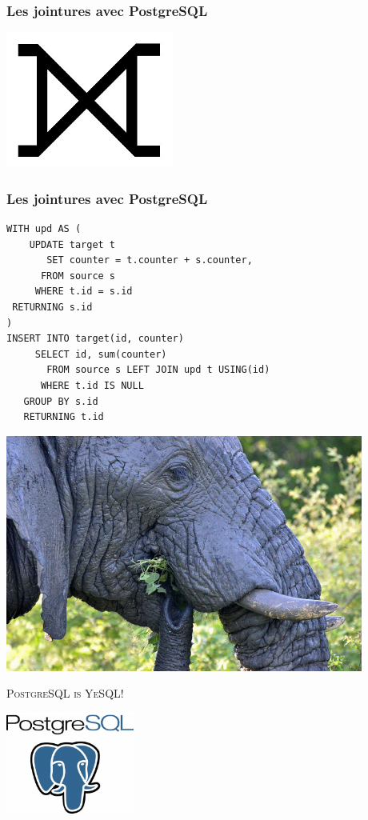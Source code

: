 \documentclass{beamer}
\begin{document}
\begin{frame}
  \frametitle{Les jointures avec PostgreSQL}

  \begin{center}
    \includegraphics[height=12em]{huge-full-outer-join.jpg}
  \end{center}
\end{frame}

\begin{frame}[fragile]
  \frametitle{Les jointures avec PostgreSQL}

  \begin{verbatim}
WITH upd AS (
    UPDATE target t
       SET counter = t.counter + s.counter,
      FROM source s
     WHERE t.id = s.id
 RETURNING s.id
)
INSERT INTO target(id, counter)
     SELECT id, sum(counter)
       FROM source s LEFT JOIN upd t USING(id)
      WHERE t.id IS NULL
   GROUP BY s.id
   RETURNING t.id
  \end{verbatim}
\end{frame}

\begin{frame}
  \begin{center}
    \includegraphics[height=21em]{postgresql-mongodb.jpg}
  \end{center}
\end{frame}

\begin{frame}
  \begin{center}
    \textsc{\Huge PostgreSQL is YeSQL!}
    \vfill

    \includegraphics[height=9em]{postgres-logo.png}
  \end{center}
\end{frame}
\end{document}
